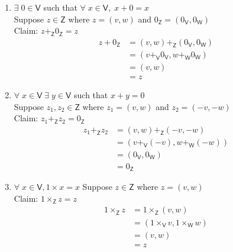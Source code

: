 \documentclass[letterpaper,12pt]{article}
\newcommand{\?}{\stackrel{?}{=}}
\begin{document}
\begin{spacing}{1.5}
\begin{enumerate}
\begin{enumerate}[(VS 1)]
\item $\exists\; 0 \in \mathsf{V}$ such that $\forall\; x \in
  \mathsf{V}, \;x + 0 = x$\\
Suppose $z \in \mathsf{Z}$ where $z = \left(v,w\right)$ and $0_\mathsf{Z} = \left(0_\mathsf{V},0_\mathsf{W}\right)$\\
Claim: $z +_\mathsf{Z} 0_\mathsf{Z} = z$
\begin{align}
z + 0_\mathsf{Z} &= \left(v,w\right) +_\mathsf{Z}
\left(0_\mathsf{V},0_\mathsf{W}\right)\\
&= \left(v+_\mathsf{V}0_\mathsf{V},w+_\mathsf{W}0_\mathsf{W}\right)\\
&= \left(v,w\right)\\
&= z
\end{align}
\newpage{}

\item $\forall\; x \in \mathsf{V}\; \exists\; y \in \mathsf{V}$ such that
  $x + y =0$\\
Suppose $z_1,z_2 \in \mathsf{Z}$ where $z_1 = \left(v,w\right)$ and
$z_2 = \left(-v,-w\right)$\\
Claim: $z_1 +_\mathsf{Z} z_2 = 0_\mathsf{Z}$
\begin{align}
z_1 +_\mathsf{Z} z_2 &= \left(v,w\right) +_\mathsf{Z}
\left(-v,-w\right)\\
&= \left(v +_\mathsf{V} \left(-v\right), w +_\mathsf{W}
  \left(-w\right)\right)\\
&=\left(0_\mathsf{V},0_\mathsf{W}\right)\\
&=0_\mathsf{Z}
\end{align}

\item $\forall\; x \in \mathsf{V}, 1\times x = x$
Suppose $z \in \mathsf{Z}$ where $z = \left(v,w\right)$\\
Claim: $1 \times_\mathsf{Z} z = z$
\begin{align}
1 \times_\mathsf{Z} z &= 1 \times_\mathsf{Z} \left(v,w\right)\\
&= \left(1\times_\mathsf{V}v,1\times_\mathsf{W}w\right)\\
&= \left(v,w\right)\\
&= z
\end{align}


\end{enumerate}
\end{enumerate}
\end{spacing}
\end{document}
